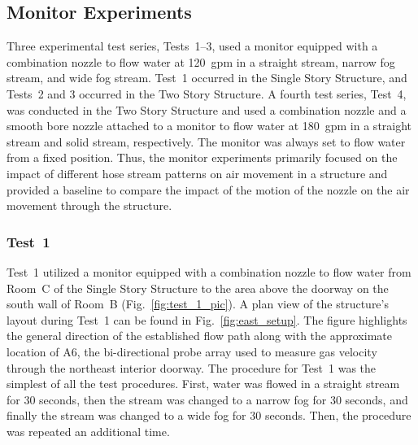 \documentclass[12pt,oneside]{book}
\begin{document}
\subsection{Monitor Experiments}
\label{sec:monitor_procedure}
Three experimental test series, Tests~1--3, used a monitor equipped with a combination nozzle to flow water at 120~gpm in a straight stream, narrow fog stream, and wide fog stream. Test~1 occurred in the Single Story Structure, and Tests~2 and 3 occurred in the Two Story Structure. A fourth test series, Test~4, was conducted in the Two Story Structure and used a combination nozzle and a smooth bore nozzle attached to a monitor to flow water at 180~gpm in a straight stream and solid stream, respectively. The monitor was always set to flow water from a fixed position. Thus, the monitor experiments primarily focused on the impact of different hose stream patterns on air movement in a structure and provided a baseline to compare the impact of the motion of the nozzle on the air movement through the structure.

\subsubsection{Test~1}
Test~1 utilized a monitor equipped with a combination nozzle to flow water from Room~C of the Single Story Structure to the area above the doorway on the south wall of Room~B (Fig.~\ref{fig:test_1_pic}). A plan view of the structure's layout during Test~1 can be found in Fig.~\ref{fig:east_setup}. The figure highlights the general direction of the established flow path along with the approximate location of A6, the bi-directional probe array used to measure gas velocity through the northeast interior doorway. The procedure for Test~1 was the simplest of all the test procedures. First, water was flowed in a straight stream for 30 seconds, then the stream was changed to a narrow fog for 30 seconds, and finally the stream was changed to a wide fog for 30 seconds. Then, the procedure was repeated an additional time.
\end{document}
